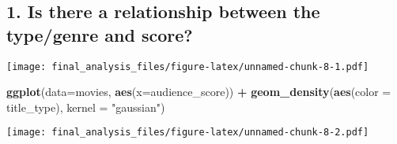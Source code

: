 \documentclass[]{article}
\newenvironment{Shaded}{\begin{snugshade}}{\end{snugshade}}
\newcommand{\DataTypeTok}[1]{\textcolor[rgb]{0.13,0.29,0.53}{#1}}
\newcommand{\DecValTok}[1]{\textcolor[rgb]{0.00,0.00,0.81}{#1}}
\newcommand{\FloatTok}[1]{\textcolor[rgb]{0.00,0.00,0.81}{#1}}
\newcommand{\KeywordTok}[1]{\textcolor[rgb]{0.13,0.29,0.53}{\textbf{#1}}}
\newcommand{\NormalTok}[1]{#1}
\newcommand{\OperatorTok}[1]{\textcolor[rgb]{0.81,0.36,0.00}{\textbf{#1}}}
\newcommand{\StringTok}[1]{\textcolor[rgb]{0.31,0.60,0.02}{#1}}
\begin{document}
\hypertarget{is-there-a-relationship-between-the-typegenre-and-score-1}{%
\subsection{1. Is there a relationship between the type/genre and
score?}\label{is-there-a-relationship-between-the-typegenre-and-score-1}}

\begin{Shaded}
\end{Shaded}

\texttt{[image: final\_analysis\_files/figure-latex/unnamed-chunk-8-1.pdf]}

\begin{Shaded}
\begin{Highlighting}[]
\KeywordTok{ggplot}\NormalTok{(}\DataTypeTok{data=}\NormalTok{movies, }\KeywordTok{aes}\NormalTok{(}\DataTypeTok{x=}\NormalTok{audience_score)) }\OperatorTok{+}\StringTok{ }\KeywordTok{geom_density}\NormalTok{(}\KeywordTok{aes}\NormalTok{(}\DataTypeTok{color =}\NormalTok{ title_type), }\DataTypeTok{kernel =} \StringTok{"gaussian"}\NormalTok{)}
\end{Highlighting}
\end{Shaded}

\texttt{[image: final\_analysis\_files/figure-latex/unnamed-chunk-8-2.pdf]}
\end{document}
